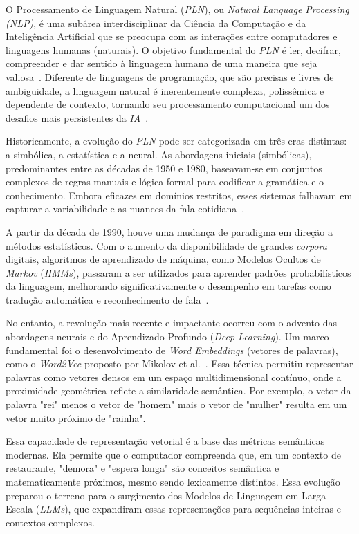 \documentclass[12pt, a4paper]{article}
\numberwithin{equation}{section}
\begin{document}
O Processamento de Linguagem Natural (\textit{PLN}), ou \textit{Natural Language Processing (NLP)}, é uma subárea interdisciplinar da Ciência da Computação e da Inteligência Artificial que se preocupa com as interações entre computadores e linguagens humanas (naturais). O objetivo fundamental do \textit{PLN} é ler, decifrar, compreender e dar sentido à linguagem humana de uma maneira que seja valiosa~\cite{chowdhary2020natural}. Diferente de linguagens de programação, que são precisas e livres de ambiguidade, a linguagem natural é inerentemente complexa, polissêmica e dependente de contexto, tornando seu processamento computacional um dos desafios mais persistentes da \textit{IA}~\cite{jurafsky2024speech}.

Historicamente, a evolução do \textit{PLN} pode ser categorizada em três eras distintas: a simbólica, a estatística e a neural. As abordagens iniciais (simbólicas), predominantes entre as décadas de 1950 e 1980, baseavam-se em conjuntos complexos de regras manuais e lógica formal para codificar a gramática e o conhecimento. Embora eficazes em domínios restritos, esses sistemas falhavam em capturar a variabilidade e as nuances da fala cotidiana~\cite{hirschberg2015advances}.

A partir da década de 1990, houve uma mudança de paradigma em direção a métodos estatísticos. Com o aumento da disponibilidade de grandes \textit{corpora} digitais, algoritmos de aprendizado de máquina, como Modelos Ocultos de \textit{Markov} (\textit{HMMs}), passaram a ser utilizados para aprender padrões probabilísticos da linguagem, melhorando significativamente o desempenho em tarefas como tradução automática e reconhecimento de fala~\cite{manning1999foundations}.

No entanto, a revolução mais recente e impactante ocorreu com o advento das abordagens neurais e do Aprendizado Profundo (\textit{Deep Learning}). Um marco fundamental foi o desenvolvimento de \textit{Word Embeddings} (vetores de palavras), como o \textit{Word2Vec} proposto por Mikolov et al.~\cite{mikolov2013efficient}. Essa técnica permitiu representar palavras como vetores densos em um espaço multidimensional contínuo, onde a proximidade geométrica reflete a similaridade semântica. Por exemplo, o vetor da palavra "rei" menos o vetor de "homem" mais o vetor de "mulher" resulta em um vetor muito próximo de "rainha".

Essa capacidade de representação vetorial é a base das métricas semânticas modernas. Ela permite que o computador compreenda que, em um contexto de restaurante, "demora" e "espera longa" são conceitos semântica e matematicamente próximos, mesmo sendo lexicamente distintos. Essa evolução preparou o terreno para o surgimento dos Modelos de Linguagem em Larga Escala (\textit{LLMs}), que expandiram essas representações para sequências inteiras e contextos complexos.
\end{document}
